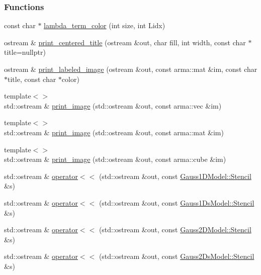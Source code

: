 \subsubsection*{Functions}
\begin{DoxyCompactItemize}
\item 
const char $\ast$ \hyperlink{namespacemappel_a04656452adb7884e197a68ee4c642f6b}{lambda\+\_\+term\+\_\+color} (int size, int Lidx)
\item 
ostream \& \hyperlink{namespacemappel_a88fc8fe46dcf69cc0e0861d2f6f28a4e}{print\+\_\+centered\+\_\+title} (ostream \&out, char fill, int width, const char $\ast$title=nullptr)
\item 
ostream \& \hyperlink{namespacemappel_ab2dadb64b79f80c01086ce2c3d42e642}{print\+\_\+labeled\+\_\+image} (ostream \&out, const arma\+::mat \&im, const char $\ast$title, const char $\ast$color)
\item 
{\footnotesize template$<$$>$ }\\std\+::ostream \& \hyperlink{namespacemappel_a846ffe01da2a5333d847cbb7845861e8}{print\+\_\+image} (std\+::ostream \&out, const arma\+::vec \&im)
\item 
{\footnotesize template$<$$>$ }\\std\+::ostream \& \hyperlink{namespacemappel_ad8730f7a4e2aadfd329c74692ea62504}{print\+\_\+image} (std\+::ostream \&out, const arma\+::mat \&im)
\item 
{\footnotesize template$<$$>$ }\\std\+::ostream \& \hyperlink{namespacemappel_a5c439f824ab91a6e426685d74ee90a33}{print\+\_\+image} (std\+::ostream \&out, const arma\+::cube \&im)
\item 
std\+::ostream \& \hyperlink{namespacemappel_ade30cb844a141741b110c52cdc433e69}{operator$<$$<$} (std\+::ostream \&out, const \hyperlink{classmappel_1_1Gauss1DModel_1_1Stencil}{Gauss1\+D\+Model\+::\+Stencil} \&s)
\item 
std\+::ostream \& \hyperlink{namespacemappel_a22c37b5ca505385ebe722a7bc3e2d874}{operator$<$$<$} (std\+::ostream \&out, const \hyperlink{classmappel_1_1Gauss1DsModel_1_1Stencil}{Gauss1\+Ds\+Model\+::\+Stencil} \&s)
\item 
std\+::ostream \& \hyperlink{namespacemappel_a26f5292b0b83c1b95c1d6c0a5d3a15ae}{operator$<$$<$} (std\+::ostream \&out, const \hyperlink{classmappel_1_1Gauss2DModel_1_1Stencil}{Gauss2\+D\+Model\+::\+Stencil} \&s)
\item 
std\+::ostream \& \hyperlink{namespacemappel_a90e45f1983acf5114399c7ef0918b125}{operator$<$$<$} (std\+::ostream \&out, const \hyperlink{classmappel_1_1Gauss2DsModel_1_1Stencil}{Gauss2\+Ds\+Model\+::\+Stencil} \&s)

\end{DoxyCompactItemize}
